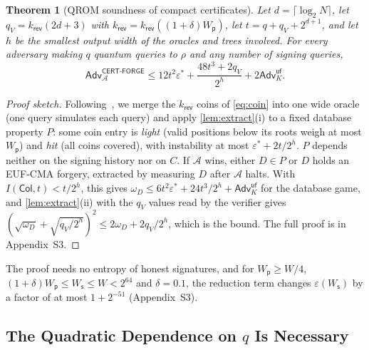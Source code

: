 \documentclass[10pt,journal,compsoc]{IEEEtran}
\theoremstyle{tplain}
\newtheorem{theorem}{Theorem}
\theoremstyle{tdef}
\theoremstyle{remark}
\newcommand{\supp}[1]{Appendix~#1}
\newcommand{\Adv}{\mathsf{Adv}}
\newcommand{\Ws}{W_{\mathsf{s}}}
\newcommand{\Wp}{W_{\mathsf{p}}}
\newcommand{\kr}{k_{\mathsf{rev}}}
\newcommand{\RO}{\rho}
\begin{document}
\begin{theorem}[QROM soundness of compact certificates]\label{thm:qrom}
Let $d=\lceil\log_2N\rceil$, let $q_V=\kr(2d+3)$ with $\kr=\kr((1+\delta)\Wp)$, let $t=q+q_V+2^{d+1}$, and let $h$ be the smallest output width of the oracles and trees involved. For every adversary making $q$ quantum queries to $\RO$ and any number of signing queries,
\[
\Adv^{\mathsf{CERT\text{-}FORGE}}_{\mathcal A}\le 12t^2\varepsilon^\ast+\frac{48t^3+2q_V}{2^{h}}+2\Adv^{\mathsf{uf}}_{K}.
\]
\end{theorem}

\begin{proof}[Proof sketch]
Following~\cite{bcs2016,chiesa2019qrom}, we merge the $\kr$ coins of \cref{eq:coin} into one wide oracle (one query simulates each query) and apply \cref{lem:extract}(i) to a fixed database property $P$: some coin entry is \emph{light} (valid positions below its roots weigh at most $\Wp$) and \emph{hit} (all coins covered), with instability at most $\varepsilon^\ast+2t/2^h$. $P$ depends neither on the signing history nor on $C$. If $\mathcal A$ wins, either $D\in P$ or $D$ holds an EUF-CMA forgery, extracted by measuring $D$ after $\mathcal A$ halts. With $I(\mathsf{Col},t)<t/2^h$, this gives $\omega_D\le6t^2\varepsilon^\ast+24t^3/2^h+\Adv^{\mathsf{uf}}_K$ for the database game, and \cref{lem:extract}(ii) with the $q_V$ values read by the verifier gives $(\sqrt{\omega_D}+\sqrt{q_V/2^h})^2\le2\omega_D+2q_V/2^h$, which is the bound. The full proof is in \supp{S3}.
\end{proof}

\noindent The proof needs no entropy of honest signatures, and for $\Wp\ge W/4$, $(1+\delta)\Wp\le\Ws\le W<2^{64}$ and $\delta=0.1$, the reduction term changes $\varepsilon(\Ws)$ by a factor of at most $1+2^{-51}$ (\supp{S3}).

\subsection{The Quadratic Dependence on \texorpdfstring{$q$}{q} Is Necessary}
\end{document}
